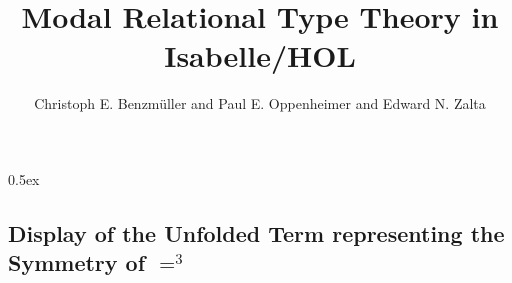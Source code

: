 \documentclass[11pt,a4paper]{article}
\begin{document}
\title{Modal Relational Type Theory in Isabelle/HOL}
\author{Christoph E. Benzm\"uller and Paul E. Oppenheimer and Edward
  N. Zalta}
\maketitle




\parindent 0pt\parskip 0.5ex









\pagebreak
\begin{appendix} 
\section{Display of the Unfolded Term representing the Symmetry of $=^3$}
\scriptsize

\end{appendix}
\end{document}
